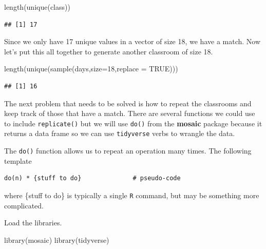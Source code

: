 \documentclass[
]{book}
\newenvironment{Shaded}{\begin{snugshade}}{\end{snugshade}}
\newcommand{\AttributeTok}[1]{\textcolor[rgb]{0.77,0.63,0.00}{#1}}
\newcommand{\ConstantTok}[1]{\textcolor[rgb]{0.00,0.00,0.00}{#1}}
\newcommand{\DecValTok}[1]{\textcolor[rgb]{0.00,0.00,0.81}{#1}}
\newcommand{\FunctionTok}[1]{\textcolor[rgb]{0.00,0.00,0.00}{#1}}
\newcommand{\NormalTok}[1]{#1}
\begin{document}
\begin{Shaded}
\begin{Highlighting}[]
\FunctionTok{length}\NormalTok{(}\FunctionTok{unique}\NormalTok{(class))}
\end{Highlighting}
\end{Shaded}

\begin{verbatim}
## [1] 17
\end{verbatim}

Since we only have 17 unique values in a vector of size 18, we have a match. Now let's put this all together to generate another classroom of size 18.

\begin{Shaded}
\begin{Highlighting}[]
\FunctionTok{length}\NormalTok{(}\FunctionTok{unique}\NormalTok{(}\FunctionTok{sample}\NormalTok{(days,}\AttributeTok{size=}\DecValTok{18}\NormalTok{,}\AttributeTok{replace =} \ConstantTok{TRUE}\NormalTok{)))}
\end{Highlighting}
\end{Shaded}

\begin{verbatim}
## [1] 16
\end{verbatim}

The next problem that needs to be solved is how to repeat the classrooms and keep track of those that have a match. There are several functions we could use to include \texttt{replicate()} but we will use \texttt{do()} from the \textbf{mosaic} package because it returns a data frame so we can use \texttt{tidyverse} verbs to wrangle the data.

The \texttt{do()} function allows us to repeat an operation many times. The following template

\begin{verbatim}
do(n) * {stuff to do}              # pseudo-code
\end{verbatim}

where \{stuff to do\} is typically a single \texttt{R} command, but may be something more complicated.

Load the libraries.

\begin{Shaded}
\begin{Highlighting}[]
\FunctionTok{library}\NormalTok{(mosaic)}
\FunctionTok{library}\NormalTok{(tidyverse)}
\end{Highlighting}
\end{Shaded}
\end{document}
